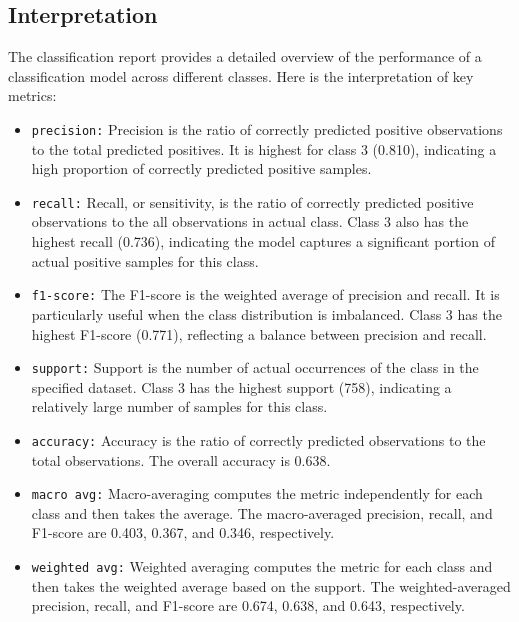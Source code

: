 \documentclass{article}
\begin{document}
\subsection{Interpretation}

The classification report provides a detailed overview of the performance of a classification model across different classes. Here is the interpretation of key metrics:

\begin{itemize}
    \item \texttt{precision:} Precision is the ratio of correctly predicted positive observations to the total predicted positives. It is highest for class 3 (0.810), indicating a high proportion of correctly predicted positive samples.

    \item \texttt{recall:} Recall, or sensitivity, is the ratio of correctly predicted positive observations to the all observations in actual class. Class 3 also has the highest recall (0.736), indicating the model captures a significant portion of actual positive samples for this class.

    \item \texttt{f1-score:} The F1-score is the weighted average of precision and recall. It is particularly useful when the class distribution is imbalanced. Class 3 has the highest F1-score (0.771), reflecting a balance between precision and recall.

    \item \texttt{support:} Support is the number of actual occurrences of the class in the specified dataset. Class 3 has the highest support (758), indicating a relatively large number of samples for this class.

    \item \texttt{accuracy:} Accuracy is the ratio of correctly predicted observations to the total observations. The overall accuracy is 0.638.

    \item \texttt{macro avg:} Macro-averaging computes the metric independently for each class and then takes the average. The macro-averaged precision, recall, and F1-score are 0.403, 0.367, and 0.346, respectively.

    \item \texttt{weighted avg:} Weighted averaging computes the metric for each class and then takes the weighted average based on the support. The weighted-averaged precision, recall, and F1-score are 0.674, 0.638, and 0.643, respectively.

\end{itemize}
\end{document}
